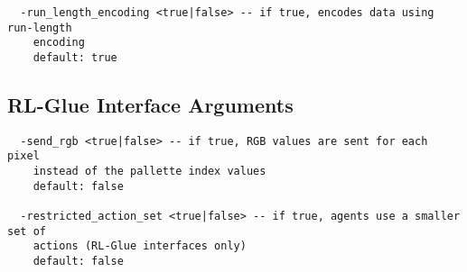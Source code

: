 \documentclass[12pt]{article}
\begin{document}
\small{
\begin{verbatim}
  -run_length_encoding <true|false> -- if true, encodes data using run-length
    encoding
    default: true
\end{verbatim}
}

\subsection{RL-Glue Interface Arguments}

\small{
\begin{verbatim}
  -send_rgb <true|false> -- if true, RGB values are sent for each pixel
    instead of the pallette index values
    default: false
    
  -restricted_action_set <true|false> -- if true, agents use a smaller set of 
    actions (RL-Glue interfaces only)
    default: false    
\end{verbatim}
}
\end{document}
